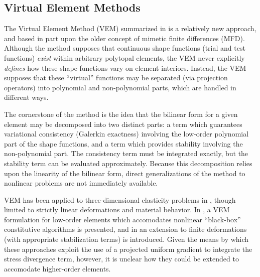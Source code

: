 	\subsection{Virtual Element Methods}
		The Virtual Element Method (VEM) summarized in \cite{Veiga:13} is a relatively new approach, and based in part upon the older concept of mimetic finite differences (MFD). Although the method supposes that continuous shape functions (trial and test functions) \textit{exist} within arbitrary polytopal elements, the VEM never explicitly \textit{defines} how these shape functions vary on element interiors. Instead, the VEM supposes that these ``virtual'' functions may be separated (via projection operators) into polynomial and non-polynomial parts, which are handled in different ways.
		
		The cornerstone of the method is the idea that the bilinear form for a given element may be decomposed into two distinct parts: a term which guarantees variational consistency (Galerkin exactness) involving the low-order polynomial part of the shape functions, and a term which provides stability involving the non-polynomial part. The consistency term must be integrated exactly, but the stability term can be evaluated approximately. Because this decomposition relies upon the linearity of the bilinear form, direct generalizations of the method to nonlinear problems are not immediately available.
		
		VEM has been applied to three-dimensional elasticity problems in \cite{Gain:13}, though limited to strictly linear deformations and material behavior. In \cite{Veiga:15}, a VEM formulation for low-order elements which accomodates nonlinear ``black-box'' constitutive algorithms is presented, and in \cite{Chi:17} an extension to finite deformations (with appropriate stabilization terms) is introduced. Given the means by which these approaches exploit the use of a projected uniform gradient to integrate the stress divergence term, however, it is unclear how they could be extended to accomodate higher-order elements.
		
